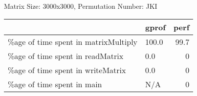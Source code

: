 \documentclass{article}
\begin{document}
    Matrix Size: 3000x3000, Permutation Number: JKI \\
    \begin{tabular}{llr}
\hline
                                      & gprof   &   perf \\
\hline
 \%age of time spent in matrixMultiply & 100.0   &   99.7 \\
 \%age of time spent in readMatrix     & 0.0     &    0   \\
 \%age of time spent in writeMatrix    & 0.0     &    0   \\
 \%age of time spent in main           & N/A     &    0   \\
\hline
\end{tabular}
    
\end{document}
